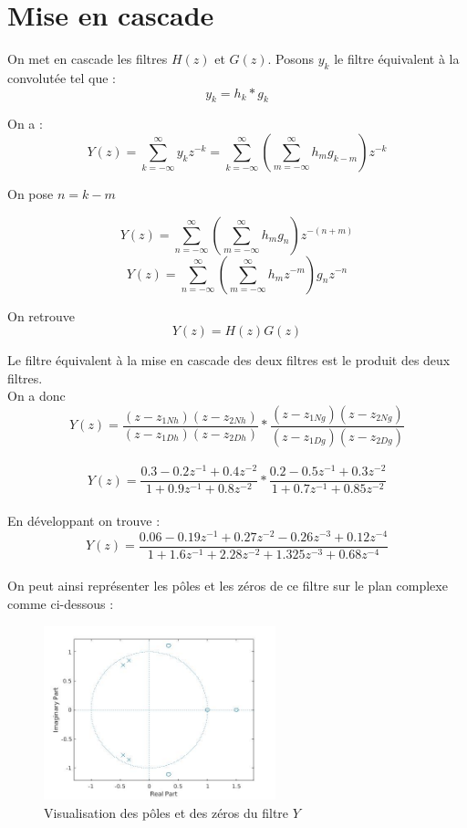 \documentclass[12,french]{report}
\begin{document}
\chapter{Mise en cascade}

On met en cascade les filtres $H(z)$ et $G(z)$. Posons $y_k$ le filtre équivalent à la convolutée tel que : 
$$y_k=h_k*g_k$$

On a :
$$ Y(z)=\sum_{k=-\infty}^{\infty}y_kz^{-k}=\sum_{k=-\infty}^{\infty}\left(\sum_{m=-\infty}^{\infty}h_mg_{k-m}\right)z^{-k} $$

On pose $n=k-m$

$$ Y(z)=\sum_{n=-\infty}^{\infty}\left(\sum_{m=-\infty}^{\infty}h_mg_n\right)z^{-(n+m)} $$
$$ Y(z)=\sum_{n=-\infty}^{\infty}\left(\sum_{m=-\infty}^{\infty}h_mz^{-m}\right)g_nz^{-n} $$

On retrouve
$$ Y(z)=H(z)G(z) $$

Le filtre équivalent à la mise en cascade des deux filtres est le produit des deux filtres.\\

On a donc \\
$$ Y(z)= \frac{(z-z_{1Nh})(z-z_{2Nh})}{(z-z_{1Dh})(z-z_{2Dh})}*\frac{(z-z_{1Ng})(z-z_{2Ng})}{(z-z_{1Dg})(z-z_{2Dg})} $$\\
$$Y(z)= \frac{0.3-0.2z^{-1}+0.4z^{-2}}{1+0.9z^{-1}+0.8z^{-2}}*\frac{0.2-0.5z^{-1}+0.3z^{-2}}{1+0.7z^{-1}+0.85z^{-2}} $$\\

En développant on trouve :
$$Y(z)=\frac{0.06-0.19z^{-1}+0.27z^{-2}-0.26z^{-3}+0.12z^{-4}}{1+1.6z^{-1}+2.28z^{-2}+1.325z^{-3}+0.68z^{-4}} $$\\

On peut ainsi représenter les pôles et les zéros de ce filtre sur le plan complexe comme ci-dessous :

\begin{figure}[H]
	\center
	\includegraphics[width=0.6\textwidth]{./Images/zplane_HG}
	\caption{Visualisation des pôles et des zéros du filtre $Y$}
\end{figure}\vspace{0.2cm}
\end{document}
